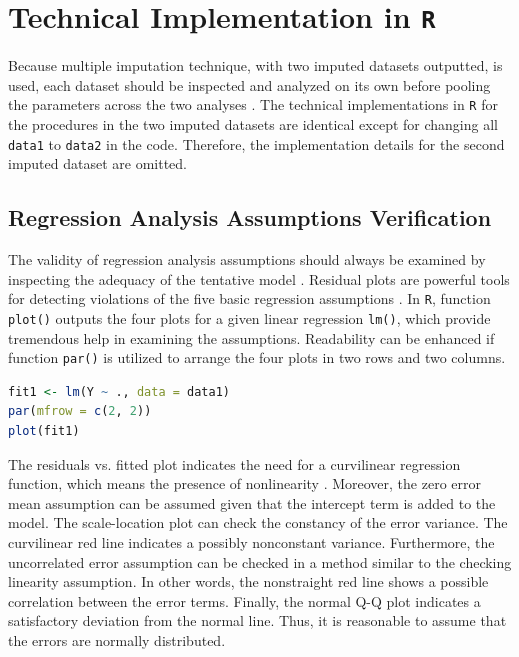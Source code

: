 \documentclass[11pt]{article}
\begin{document}
\appendix
\section{Technical Implementation in \texttt{R}}
Because multiple imputation technique, with two imputed datasets outputted, is used, each dataset should be inspected and analyzed on its own before pooling the parameters across the two analyses \cite{bk:buuren}. The technical implementations in \texttt{R} for the procedures in the two imputed datasets are identical except for changing all \texttt{data1} to \texttt{data2} in the code. Therefore, the implementation details for the second imputed dataset are omitted.

\subsection{Regression Analysis Assumptions Verification}
The validity of regression analysis assumptions should always be examined  by inspecting the adequacy of the tentative model \cite{bk:montgomery}. Residual plots are powerful tools for detecting violations of the five basic regression assumptions \cite{bk:montgomery}. In \texttt{R}, function \texttt{plot()} outputs the four plots for a given linear regression \texttt{lm()}, which provide tremendous help in examining the assumptions. Readability can be enhanced if function \texttt{par()} is utilized to arrange the four plots in two rows and two columns.

\begin{file}[project.r]
\begin{lstlisting}[language = R]
fit1 <- lm(Y ~ ., data = data1)
par(mfrow = c(2, 2))
plot(fit1)
\end{lstlisting}
\end{file}

The residuals vs. fitted plot indicates the need for a curvilinear regression function, which means the presence of nonlinearity \cite{bk:kutner, bk:montgomery}. Moreover, the zero error mean assumption can be assumed given that the intercept term is added to the model. The scale-location plot can check the constancy of the error variance. The curvilinear red line indicates a possibly nonconstant variance. Furthermore, the uncorrelated error assumption can be checked in a method similar to the checking linearity assumption. In other words, the nonstraight red line shows a possible correlation between the error terms. Finally, the normal Q-Q plot indicates a satisfactory deviation from the normal line. Thus, it is reasonable to assume that the errors are normally distributed.
\end{document}
